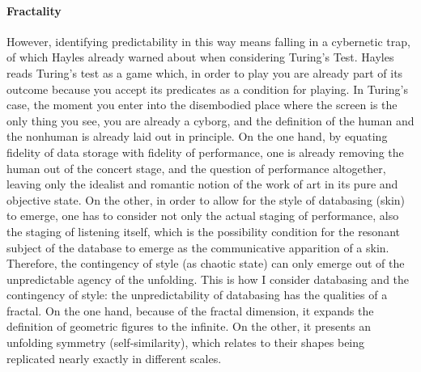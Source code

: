 
\paragraph{Fractality}
However, identifying predictability in this way means falling in a cybernetic trap, of which Hayles already warned about when considering Turing's Test. Hayles reads Turing's test as a game which, in order to play you are already part of its outcome because you accept its predicates as a condition for playing. In Turing's case, the moment you enter into the disembodied place where the screen is the only thing you see, you are already a cyborg, and the definition of the human and the nonhuman is already laid out in principle. On the one hand, by equating fidelity of data storage with fidelity of performance, one is already removing the human out of the concert stage, and the question of performance altogether, leaving only the idealist and romantic notion of the work of art in its pure and objective state. On the other, in order to allow for the style of databasing (skin) to emerge, one has to consider not only the actual staging of performance, also the staging of listening itself, which is the possibility condition for the resonant subject of the database to emerge as the communicative apparition of a skin. Therefore, the contingency of style (as chaotic state) can only emerge out of the unpredictable agency of the unfolding. This is how I consider databasing and the contingency of style: the unpredictability of databasing has the qualities of a fractal. On the one hand, because of the fractal dimension, it expands the definition of geometric figures to the infinite. On the other, it presents an unfolding symmetry (self-similarity), which relates to their shapes being replicated nearly exactly in different scales. 

